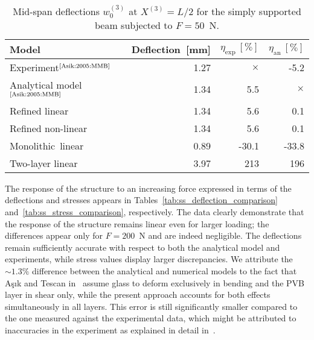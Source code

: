 \documentclass[11pt]{article}
\newcommand{\rev}[1]{#1}
\newcommand{\lay}[1]{^{(#1)}}
\newcommand{\X}[1]{X\lay{#1}}
\newcommand{\wc}[1]{w_0\lay{#1}}
\newcommand{\etaexp}{\eta_\mathrm{exp}}
\newcommand{\etaan}{\eta_\mathrm{an}}
\begin{document}
\begin{table}[ht]
\caption{Mid-span deflections $\wc{3}$ at $\X{3} = L/2$ for the simply supported
beam subjected to $F = 50$~N.}
\label{tab:simple_beam_mid_span}
\centering
\begin{tabular}{lrrr}
\hline
Model	& Deflection~[mm]	& $\etaexp~[\%]$ & $\etaan~[\%]$ \\
\hline
Experiment$^\text{\cite{Asik:2005:MMB}}$ &
1.27 & $\times$ & -5.2 \\
Analytical model$^\text{\cite{Asik:2005:MMB}}$ & 
1.34 & 5.5 & $\times$ \\
\rev{Refined} linear & 
1.34 & 5.6 & 0.1 \\
\rev{Refined} non-linear & 
1.34 & 5.6 & 0.1 \\
Monolithic~\rev{linear} & 
0.89 & -30.1 & -33.8 \\
\rev{Two-layer linear} &
3.97 & 213 & 196 \\
\hline
\end{tabular}
\end{table}

The response of the structure to an increasing force expressed in terms of
the deflections and stresses appears in
Tables~\ref{tab:ss_deflection_comparison} and~\ref{tab:ss_stress_comparison},
respectively. The data clearly demonstrate that the response of the structure
remains linear even for larger loading; the differences appear only for
$F=200$~N and are indeed negligible. The deflections remain sufficiently
accurate with respect to both the analytical model and experiments, while stress
values display larger discrepancies. We attribute the $\sim 1.3\%$ difference
between the analytical and numerical models to the fact that A\c{s}\i{}k and
Tescan in~\cite{Asik:2005:MMB} assume glass to deform exclusively in bending and
the PVB layer in shear only, while the present approach accounts for both
effects simultaneously in all layers. This error is still significantly smaller
compared to the one measured against the experimental data, which might be
attributed to inaccuracies in the experiment as explained in detail
in~\cite{Asik:2005:MMB}.
\end{document}
